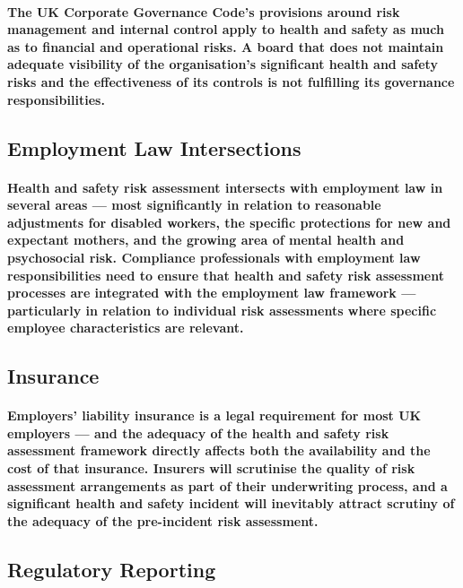 \paragraph{The \textbf{UK Corporate Governance Code's} provisions around risk management and internal control apply to health and safety as much as to financial and operational risks. A board that does not maintain adequate visibility of the organisation's significant health and safety risks and the effectiveness of its controls is not fulfilling its governance responsibilities.}

\subsection{Employment Law Intersections}
\paragraph{Health and safety risk assessment intersects with employment law in several areas — most significantly in relation to reasonable adjustments for disabled workers, the specific protections for new and expectant mothers, and the growing area of mental health and psychosocial risk. Compliance professionals with employment law responsibilities need to ensure that health and safety risk assessment processes are integrated with the employment law framework — particularly in relation to individual risk assessments where specific employee characteristics are relevant.}

\subsection{Insurance}
\paragraph{Employers' liability insurance is a legal requirement for most UK employers — and the adequacy of the health and safety risk assessment framework directly affects both the availability and the cost of that insurance. Insurers will scrutinise the quality of risk assessment arrangements as part of their underwriting process, and a significant health and safety incident will inevitably attract scrutiny of the adequacy of the pre-incident risk assessment.}

\subsection{Regulatory Reporting}
